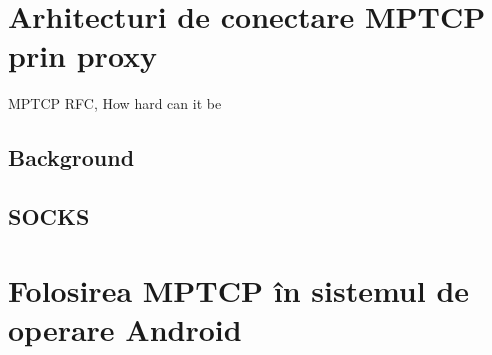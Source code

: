 \chapter{Arhitecturi de conectare  MPTCP prin proxy}
\label{sec:arch_upb}

MPTCP RFC\cite{rfc6824bis}, How hard can it be \cite{mptcp-nsdi}

\section{Background}
\section{SOCKS}



\chapter{Folosirea MPTCP în sistemul de operare Android}
\label{sec:mptcp_android}


